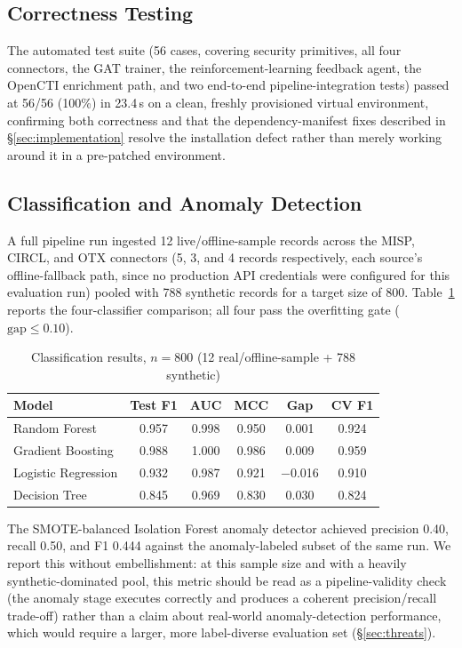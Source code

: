 \documentclass[conference]{IEEEtran}
\begin{document}
\subsection{Correctness Testing}
The automated test suite (56 cases, covering security primitives, all four connectors, the GAT trainer, the reinforcement-learning feedback agent, the OpenCTI enrichment path, and two end-to-end pipeline-integration tests) passed at 56/56 (100\%) in 23.4\,s on a clean, freshly provisioned virtual environment, confirming both correctness and that the dependency-manifest fixes described in \S\ref{sec:implementation} resolve the installation defect rather than merely working around it in a pre-patched environment.

\subsection{Classification and Anomaly Detection}
A full pipeline run ingested 12 live/offline-sample records across the MISP, CIRCL, and OTX connectors (5, 3, and 4 records respectively, each source's offline-fallback path, since no production API credentials were configured for this evaluation run) pooled with 788 synthetic records for a target size of 800. Table~\ref{tab:classification} reports the four-classifier comparison; all four pass the overfitting gate ($\mathrm{gap} \leq 0.10$).

\begin{table}[h]
\caption{Classification results, $n=800$ (12 real/offline-sample + 788 synthetic)}
\label{tab:classification}
\centering
\begin{tabular}{@{}lccccc@{}}
\toprule
\textbf{Model} & \textbf{Test F1} & \textbf{AUC} & \textbf{MCC} & \textbf{Gap} & \textbf{CV F1} \\
\midrule
Random Forest & 0.957 & 0.998 & 0.950 & 0.001 & 0.924 \\
Gradient Boosting & 0.988 & 1.000 & 0.986 & 0.009 & 0.959 \\
Logistic Regression & 0.932 & 0.987 & 0.921 & $-$0.016 & 0.910 \\
Decision Tree & 0.845 & 0.969 & 0.830 & 0.030 & 0.824 \\
\bottomrule
\end{tabular}
\end{table}

The SMOTE-balanced Isolation Forest anomaly detector achieved precision 0.40, recall 0.50, and F1 0.444 against the anomaly-labeled subset of the same run. We report this without embellishment: at this sample size and with a heavily synthetic-dominated pool, this metric should be read as a pipeline-validity check (the anomaly stage executes correctly and produces a coherent precision/recall trade-off) rather than a claim about real-world anomaly-detection performance, which would require a larger, more label-diverse evaluation set (\S\ref{sec:threats}).
\end{document}
